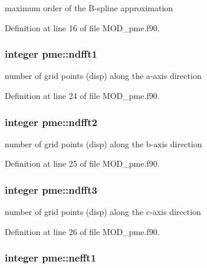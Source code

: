 maximum order of the B-\/spline approximation 



Definition at line 16 of file M\-O\-D\-\_\-pme.\-f90.

\hypertarget{classpme_a31ece1a3fdb29bfd7938214ae845faa5}{
\subsubsection[{ndfft1}]{\setlength{\rightskip}{0pt plus 5cm}integer pme\-::ndfft1}}\label{classpme_a31ece1a3fdb29bfd7938214ae845faa5}


number of grid points (disp) along the a-\/axis direction 



Definition at line 24 of file M\-O\-D\-\_\-pme.\-f90.

\hypertarget{classpme_a60c15d25258b6995199da60e0f7c61f9}{
\subsubsection[{ndfft2}]{\setlength{\rightskip}{0pt plus 5cm}integer pme\-::ndfft2}}\label{classpme_a60c15d25258b6995199da60e0f7c61f9}


number of grid points (disp) along the b-\/axis direction 



Definition at line 25 of file M\-O\-D\-\_\-pme.\-f90.

\hypertarget{classpme_a6d6685c3953c5c0755e6351a367c1a6a}{
\subsubsection[{ndfft3}]{\setlength{\rightskip}{0pt plus 5cm}integer pme\-::ndfft3}}\label{classpme_a6d6685c3953c5c0755e6351a367c1a6a}


number of grid points (disp) along the c-\/axis direction 



Definition at line 26 of file M\-O\-D\-\_\-pme.\-f90.

\hypertarget{classpme_a05ad6177dd8e91c37251408d2a71560c}{
\subsubsection[{nefft1}]{\setlength{\rightskip}{0pt plus 5cm}integer pme\-::nefft1}}\label{classpme_a05ad6177dd8e91c37251408d2a71560c}


